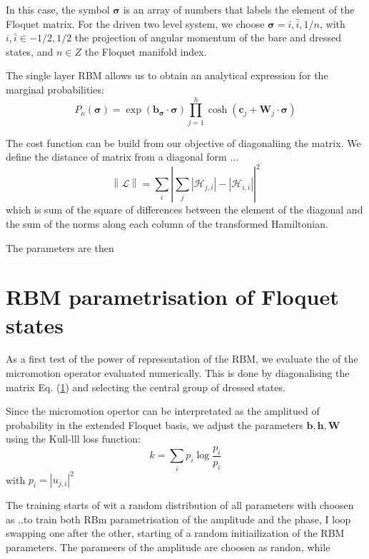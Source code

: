 \documentclass[pra,twocolumn,showkeys,preprintnumbers, amsmath,amssymb, aps,A4paper]{revtex4-1}
\begin{document}
In this case, the symbol $\boldsymbol{\sigma}$ is an array of numbers that 	labels the element of the Floquet matrix. For the driven two level system, we choose $\boldsymbol{\sigma} = i,\bar{i},1/n $, with $i,\bar{i} \in {-1/2,1/2}$ the projection of angular momentum of the bare and dressed states, and $n\in Z$ the Floquet manifold index.

The single layer RBM allows us to obtain an analytical expression for the marginal probabilities:
\begin{equation}
P_{\kappa}(\boldsymbol{\sigma}) = \exp(\boldsymbol{b}_{\boldsymbol{\sigma}}\cdot\boldsymbol{\sigma}) \prod_{j=1}^{h} \cosh(\boldsymbol{c}_j+ \boldsymbol{W}_j\cdot\boldsymbol{\sigma})
\end{equation}

The cost function can be build from our objective of diagonaliing the matrix. We define the distance of matrix from a diagonal form ...
\begin{equation}
\left\|\mathcal{L}\right\| = \sum_{i} \left| \sum_{j} |\mathcal{H}_{j,i}| - |\mathcal{H}_{i,i}| \right|^{2}
\end{equation}
which is sum of the square of differences between the element of the diagonal and the sum of the norms along each column of the transformed Hamiltonian. 

The parameters are then 


\section{\label{sec:RBMFloquetStates} RBM parametrisation of Floquet states} 

As a first test of the power of representation of the RBM, we evaluate the of the micromotion operator evaluated numerically. This is done by diagonalising the matrix Eq. (\ref{}) and selecting the central group of dressed states.

Since the micromotion opertor can be interpretated as the amplitued of probability in the extended Floquet basis, we adjust the parameters $\boldsymbol{b}, \boldsymbol{h}, \boldsymbol{W} $ using the Kull-lll loss function:
\begin{equation}
k = \sum_i p_i \log \frac{p_i}{p_i}
\end{equation}
with $p_i = |u_{j,i}|^2$

The training starts of wit a random distribution of all parameters with choosen as ..to train both RBm parametrisation of the amplitude and the phase, I loop swapping one after the other, starting of a random initiailization of the RBM parameters. The parameers of the amplitude are choosen as randon, while 
\end{document}
